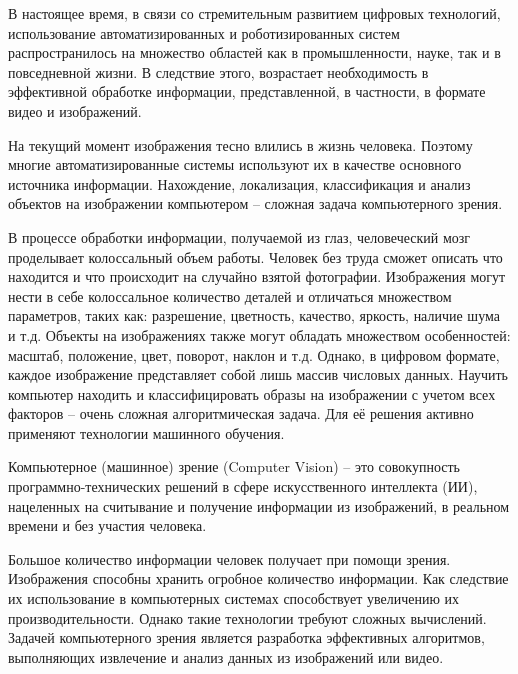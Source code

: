 В настоящее время, в связи со стремительным развитием цифровых технологий, использование автоматизированных и роботизированных систем распространилось на множество областей как в промышленности, науке, так и в повседневной жизни. В следствие этого, возрастает необходимость в эффективной обработке информации, представленной, в частности, в формате видео и изображений. 

На текущий момент изображения тесно влились в жизнь человека. Поэтому многие автоматизированные системы используют их в качестве основного источника информации. Нахождение, локализация, классификация и анализ объектов на изображении компьютером – сложная задача компьютерного зрения. 

В процессе обработки информации, получаемой из глаз, человеческий мозг проделывает колоссальный объем работы. Человек без труда сможет описать что находится и что происходит на случайно взятой фотографии. Изображения могут нести в себе колоссальное количество деталей и отличаться множеством параметров, таких как: разрешение, цветность, качество, яркость, наличие шума и т.д. Объекты на изображениях также могут обладать множеством особенностей: масштаб, положение, цвет, поворот, наклон и т.д. Однако, в цифровом формате, каждое изображение представляет собой лишь массив числовых данных.  Научить компьютер находить и классифицировать образы на изображении с учетом всех факторов – очень сложная алгоритмическая задача. Для её решения активно применяют технологии машинного обучения.

Компьютерное (машинное) зрение (Computer Vision) – это совокупность программно-технических решений в сфере искусственного интеллекта (ИИ), нацеленных на считывание и получение информации из изображений, в реальном времени и без участия человека. 

Большое количество информации человек получает при помощи зрения. 
Изображения способны хранить огробное количество информации. Как следствие их использование в компьютерных системах способствует увеличению их производительности. Однако такие технологии требуют сложных вычислений. Задачей компьютерного зрения является разработка эффективных алгоритмов, выполняющих извлечение и анализ данных из изображений или видео. 
 
